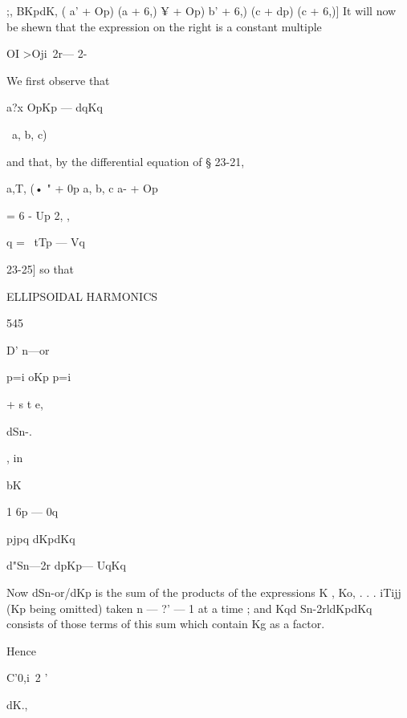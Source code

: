 { ;, BKpdK,  ( a' + Op) (a  + 6,)    ¥ + Op)  b' + 6,) (c  + dp) (c  + 6,)] 
It will now be shewn that the expression on the right is a constant multiple 

OI >Oji\ 2r— 2- 

We first observe that 



a?x  OpKp — dqKq 



\ a, b, c) 

and that, by the differential equation of § 23-21, 

a,T, (•  " + 0p   a, b, c a- + Op 

= 6 -  Up 2,   , 

q = \ tTp — Vq 



23-25] 
so that 



ELLIPSOIDAL HARMONICS 



545 



D' n—or    



p=i oKp p=i 



+ s t e, 



dSn-. 



, in 



bK 



1 6p — 0q 



pjpq dKpdKq 



d"Sn—2r dpKp— UqKq 






Now dSn-or/dKp is the sum of the products of the expressions K , Ko, 
. . . iTijj (Kp being omitted) taken  n — ?' — 1 at a time ; and Kqd Sn-2rldKpdKq 
consists of those terms of this sum which contain Kg as a factor. 



Hence 



C'0,i\ 2 ' 



dK., 



}
